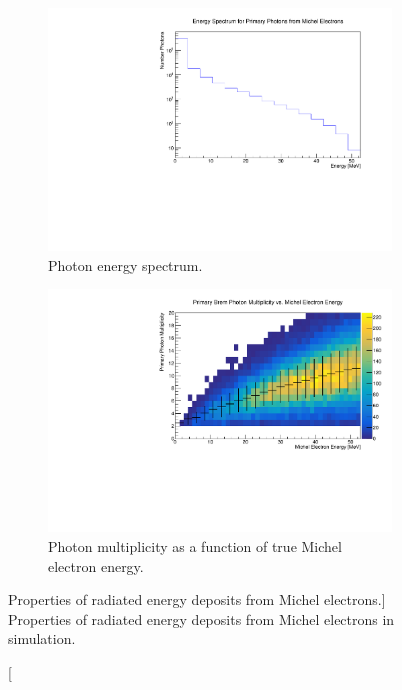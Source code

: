 \begin{figure}

	\centering

	\begin{subfigure}[b]{\textwidth}
		\includegraphics[width=\textwidth]{figures/photon_spec.pdf}
		\caption[Photon energy spectrum.]{Photon energy spectrum.}
		\label{fig:photon_spec}
	\end{subfigure}

	\vspace{5mm}

	\begin{subfigure}[b]{\textwidth}
		\includegraphics[width=\textwidth]{figures/photon_mult.pdf}
		\caption[Photon multiplicity.]{Photon multiplicity as a function of true
		Michel electron energy.}
		\label{fig:photon_mult}
	\end{subfigure}

	\caption
	[Properties of radiated energy deposits from Michel electrons.]
	{Properties of radiated energy deposits from Michel electrons in \protodune{}
	simulation.} 

	\label{fig:photon_prop}

\end{figure}

